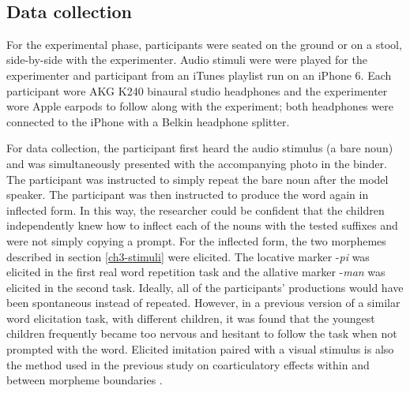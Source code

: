 \documentclass[a4paper,man,floatsintext,natbib,donotrepeattitle, apacite]{apa6}
\begin{document}
~
~

\subsection{Data collection}

For the experimental phase, participants were seated on the ground or on a stool, side-by-side with the experimenter. Audio stimuli were were played for the experimenter and participant from an iTunes playlist run on an iPhone 6. Each participant wore AKG K240 binaural studio headphones and the experimenter wore Apple earpods to follow along with the experiment; both headphones were connected to the iPhone with a Belkin headphone splitter. 

For data collection, the participant first heard the audio stimulus (a bare noun) and was simultaneously presented with the accompanying photo in the binder. The participant was instructed to simply repeat the bare noun after the model speaker. The participant was then instructed to produce the word again in inflected form. In this way, the researcher could be confident that the children independently knew how to inflect each of the nouns with the tested suffixes and were not simply copying a prompt. For the inflected form, the two morphemes described in section \ref{ch3-stimuli} were elicited. The locative marker -\textit{pi} was elicited in the first real word repetition task and the allative marker -\textit{man} was elicited in the second task. Ideally, all of the participants' productions would have been spontaneous instead of repeated. However, in a previous version of a similar word elicitation task, with different children, it was found that the youngest children frequently became too nervous and hesitant to follow the task when not prompted with the word. Elicited imitation paired with a visual stimulus is also the method used in the previous study on coarticulatory effects within and between morpheme boundaries \citep{songEffectsCoarticulationMorphological2013}.   
\end{document}
